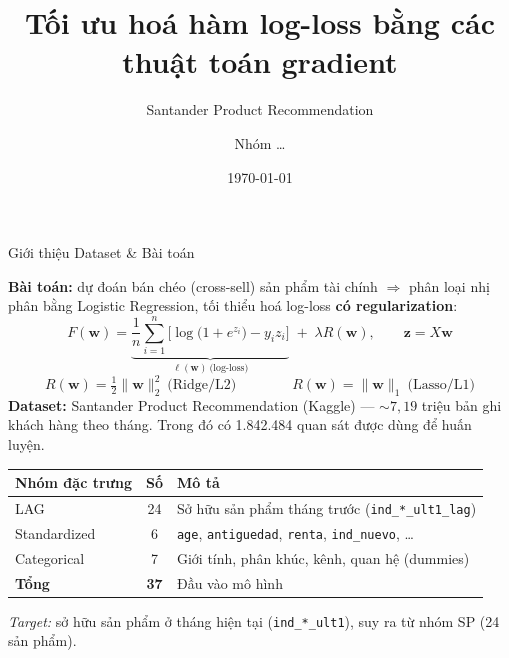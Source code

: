 \documentclass[aspectratio=169, 11pt]{beamer}
\title{Tối ưu hoá hàm log-loss bằng các thuật toán gradient}
\subtitle{Santander Product Recommendation}
\author{Nhóm \ldots}
\date{\today}
\begin{document}
\frame{\titlepage}

\begin{frame}{Giới thiệu Dataset \& Bài toán}

\textbf{Bài toán:} dự đoán bán chéo (cross-sell) sản phẩm tài chính $\Rightarrow$ phân loại nhị
phân bằng Logistic Regression, tối thiểu hoá log-loss \textbf{có regularization}:
\[
  F(\mathbf{w})=\underbrace{\frac1n\sum_{i=1}^{n}\Big[\log\big(1+e^{z_i}\big)-y_i z_i\Big]}_{\ell(\mathbf{w})\ \text{(log-loss)}}
  \;+\;\lambda R(\mathbf{w}),\qquad \mathbf{z}=X\mathbf{w}
\]
\[
  R(\mathbf{w})=\tfrac12\|\mathbf{w}\|_2^2\ \text{(Ridge/L2)}
  \qquad\qquad
  R(\mathbf{w})=\|\mathbf{w}\|_1\ \text{(Lasso/L1)}
\]
\textbf{Dataset:} Santander Product Recommendation (Kaggle) — $\sim 7{,}19$ triệu bản ghi khách hàng theo tháng.
Trong đó có 1.842.484 quan sát được dùng để huấn luyện.
\begin{center}
\small
\begin{tabular}{@{}lcl@{}}
\toprule
\textbf{Nhóm đặc trưng} & \textbf{Số} & \textbf{Mô tả} \\
\midrule
LAG & 24 & Sở hữu sản phẩm tháng trước (\texttt{ind\_*\_ult1\_lag}) \\
Standardized & 6  & \texttt{age}, \texttt{antiguedad}, \texttt{renta}, \texttt{ind\_nuevo}, \dots \\
Categorical & 7  & Giới tính, phân khúc, kênh, quan hệ (dummies) \\
\midrule
\textbf{Tổng} & \textbf{37} & Đầu vào mô hình \\
\bottomrule
\end{tabular}
\end{center}

\vspace{-0.2em}
{\footnotesize \textit{Target:} sở hữu sản phẩm ở tháng hiện tại (\texttt{ind\_*\_ult1}), suy ra từ nhóm SP (24 sản phẩm).}

\end{frame}
\end{document}
